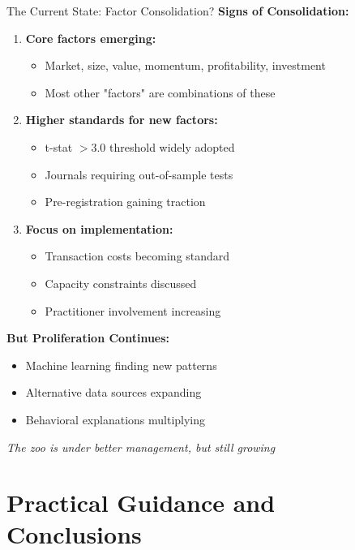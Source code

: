 \documentclass{beamer}
\begin{document}
\begin{frame}{The Current State: Factor Consolidation?}
    \textbf{Signs of Consolidation:}
    \begin{enumerate}
        \item \textbf{Core factors emerging:}
        \begin{itemize}
            \item Market, size, value, momentum, profitability, investment
            \item Most other "factors" are combinations of these
        \end{itemize}
        
        \item \textbf{Higher standards for new factors:}
        \begin{itemize}
            \item t-stat $> 3.0$ threshold widely adopted
            \item Journals requiring out-of-sample tests
            \item Pre-registration gaining traction
        \end{itemize}
        
        \item \textbf{Focus on implementation:}
        \begin{itemize}
            \item Transaction costs becoming standard
            \item Capacity constraints discussed
            \item Practitioner involvement increasing
        \end{itemize}
    \end{enumerate}
    
    
    \textbf{But Proliferation Continues:}
    \begin{itemize}
        \item Machine learning finding new patterns
        \item Alternative data sources expanding
        \item Behavioral explanations multiplying
    \end{itemize}
    
    
    \textit{The zoo is under better management, but still growing}
\end{frame}

\section{Practical Guidance and Conclusions}
\end{document}
